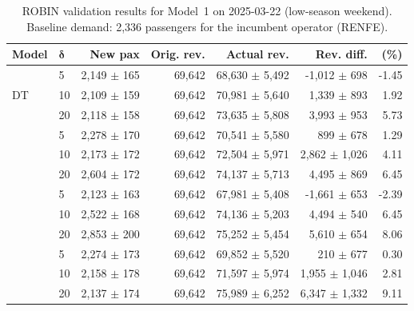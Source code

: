 \begin{table}[!h]
    \centering
    \caption{ROBIN validation results for Model~1 on 2025-03-22 (low-season weekend). Baseline demand: 2,336 passengers for the incumbent operator (RENFE).}
    \label{tab:model1_validation_2025_03_22}
    \scriptsize
    \setlength{\tabcolsep}{3pt}
    \begin{tabular}{llrrrrr}
        \toprule
        \textbf{Model}
        & \(\boldsymbol{\delta}\)
        & \textbf{New pax}
        & \textbf{Orig. rev.}
        & \textbf{Actual rev.}
        & \textbf{Rev. diff.}
        & \textbf{(\%)} \\
        \midrule
        \multirow{3}{*}{DT} & 5 & 2,149 $\pm$ 165 & 69,642 & 68,630 $\pm$ 5,492 & -1,012 $\pm$ 698 & -1.45 \\
         & 10 & 2,109 $\pm$ 159 & 69,642 & 70,981 $\pm$ 5,640 & 1,339 $\pm$ 893 & 1.92 \\
         & 20 & 2,118 $\pm$ 158 & 69,642 & 73,635 $\pm$ 5,808 & 3,993 $\pm$ 953 & 5.73 \\
        \addlinespace
        \multirow{3}{*}{RF} & 5 & 2,278 $\pm$ 170 & 69,642 & 70,541 $\pm$ 5,580 & 899 $\pm$ 678 & 1.29 \\
         & 10 & 2,173 $\pm$ 172 & 69,642 & 72,504 $\pm$ 5,971 & 2,862 $\pm$ 1,026 & 4.11 \\
         & 20 & 2,604 $\pm$ 172 & 69,642 & 74,137 $\pm$ 5,713 & 4,495 $\pm$ 869 & 6.45 \\
        \addlinespace
        \multirow{3}{*}{GBDT} & 5 & 2,123 $\pm$ 163 & 69,642 & 67,981 $\pm$ 5,408 & -1,661 $\pm$ 653 & -2.39 \\
         & 10 & 2,522 $\pm$ 168 & 69,642 & 74,136 $\pm$ 5,203 & 4,494 $\pm$ 540 & 6.45 \\
         & 20 & 2,853 $\pm$ 200 & 69,642 & 75,252 $\pm$ 5,454 & 5,610 $\pm$ 654 & 8.06 \\
        \addlinespace
        \multirow{3}{*}{FFNN} & 5 & 2,274 $\pm$ 173 & 69,642 & 69,852 $\pm$ 5,520 & 210 $\pm$ 677 & 0.30 \\
         & 10 & 2,158 $\pm$ 178 & 69,642 & 71,597 $\pm$ 5,974 & 1,955 $\pm$ 1,046 & 2.81 \\
         & 20 & 2,137 $\pm$ 174 & 69,642 & 75,989 $\pm$ 6,252 & 6,347 $\pm$ 1,332 & 9.11 \\
        \bottomrule
    \end{tabular}
\end{table}